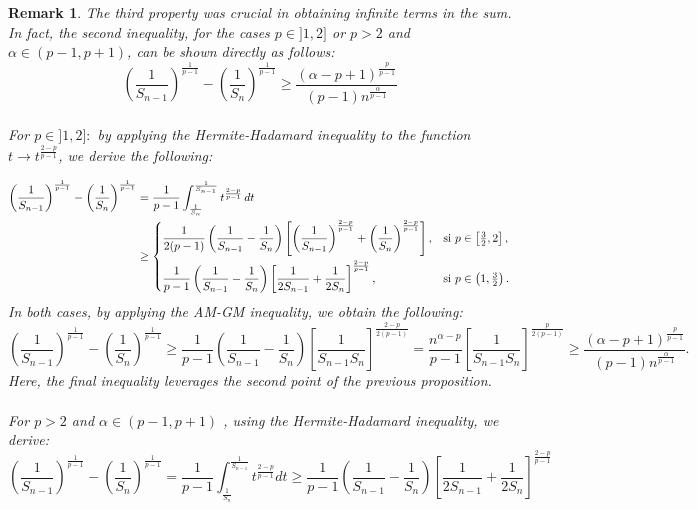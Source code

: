\documentclass[11pt]{amsart}
\newtheorem{remark}[thm]{Remark}
\newcommand{\1}{[1]}
\begin{document}
\begin{remark} \label{rmk 4.4} The third property was crucial in obtaining infinite terms in the sum. In fact, the second inequality, for the cases  $p\in ]1,2]$ or $p>2$ and $\alpha \in (p-1,p+1)$, can be shown directly as follows:  
$$\left( \frac{1}{S_{n-1}} \right)^{\frac{1}{p-1}}- \left( \frac{1}{S_{n}} \right)^{\frac{1}{p-1}} \geq  \frac{(\alpha-p+1)^{\frac{p}{p-1}}}{(p-1) n^{\frac{\alpha}{p-1}}}$$ \\ 
For $p \in ]1,2]:$ by applying the Hermite-Hadamard inequality to the function $t \to t^{\frac{2-p}{p-1}}$, we derive the following:


\begin{align*}
\left( \frac{1}{S_{n-1}} \right)^{\frac{1}{p-1}}
-
\left( \frac{1}{S_n} \right)^{\frac{1}{p-1}}
&=
\frac{1}{p-1}
\int_{\frac{1}{S_n}}^{\frac{1}{S_{n-1}}}
t^{\frac{2-p}{p-1}} \, dt  \notag \\
&\ge
\begin{cases}
\displaystyle
\frac{1}{2(p-1)}
\left( \frac{1}{S_{n-1}} - \frac{1}{S_n} \right)
\left[
\left( \frac{1}{S_{n-1}} \right)^{\frac{2-p}{p-1}}
+
\left( \frac{1}{S_n} \right)^{\frac{2-p}{p-1}}
\right],
& \text{si } p \in \left[\frac{3}{2},2\right],
\\[1.2em]
\displaystyle
\frac{1}{p-1}
\left( \frac{1}{S_{n-1}} - \frac{1}{S_n} \right)
\left[
\frac{1}{2S_{n-1}}+\frac{1}{2S_n}
\right]^{\frac{2-p}{p-1}},
& \text{si } p \in \left(1,\frac{3}{2}\right).
\end{cases}
\end{align*}
In both cases, by applying the AM-GM inequality, we obtain the following:
$$
\left( \frac{1}{S_{n-1}} \right)^{\frac{1}{p-1}} - \left( \frac{1}{S_{n}} \right)^{\frac{1}{p-1}} \geq \frac{1}{p-1} \left( \frac{1}{S_{n-1}} - \frac{1}{S_n} \right) 
\left[ \frac{1}{S_{n-1}S_{n}} \right]^{ \frac{2-p}{2(p-1)} }
= \frac{n^{\alpha-p}}{p-1} \left[ \frac{1}{S_{n-1}S_{n}} \right]^{ \frac{p}{2(p-1)} } \geq \frac{(\alpha-p+1)^{\frac{p}{p-1}}}{(p-1) n^{\frac{\alpha}{p-1}}}.
$$
Here, the final inequality leverages the second point of the previous proposition. \\ \\
For $p>2$ and $\alpha \in (p-1,p+1)$
, using the Hermite-Hadamard inequality, we derive:
$$
\left( \frac{1}{S_{n-1}} \right)^{\frac{1}{p-1}}- \left( \frac{1}{S_{n}} \right)^{\frac{1}{p-1}}=\frac{1}{p-1}
\int_{\frac{1}{S_{n}}}^{\frac{1}{S_{n-1}}} t^{\frac{2-p}{p-1}} dt \geq
\frac{1}{p-1} \left( \frac{1}{S_{n-1}} - \frac{1}{S_n} \right) \left[ \frac{1}{2 S_{n-1}}+ \frac{1}{2 S_{n}} \right]^{\frac{2-p}{p-1}} $$


\end{remark}
\end{document}
